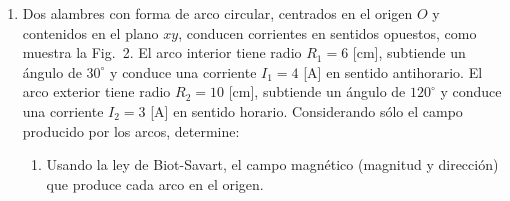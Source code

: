 \documentclass[11pt,letterpaper]{article}
\begin{document}
\begin{enumerate}
\item Dos alambres con forma de arco circular, centrados en el origen $O$ y contenidos en el plano
$xy$, conducen corrientes en sentidos opuestos, como muestra la Fig.\ 2. El arco interior tiene radio
$R_1 = 6$ [cm], subtiende un \'angulo de $30^\circ$ y conduce una corriente $I_1 = 4$ [A] en sentido
antihorario. El arco exterior tiene radio $R_2 = 10$ [cm], subtiende un \'angulo de $120^\circ$ y
conduce una corriente $I_2 = 3$ [A] en sentido horario. Considerando s\'olo el campo producido por
los arcos, determine:

\smallskip
\noindent
\begin{minipage}[c]{0.50\linewidth}
\begin{enumerate}
\item Usando la ley de Biot-Savart, el campo magn\'etico (magnitud y direcci\'on) que produce cada
arco en el origen.


\end{enumerate}
\end{minipage}
\end{enumerate}
\end{document}
